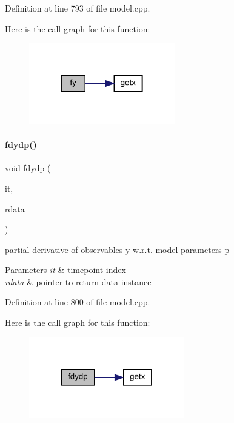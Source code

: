 Definition at line 793 of file model.\+cpp.

Here is the call graph for this function\+:
\nopagebreak
\begin{figure}[H]
\begin{center}
\leavevmode
\includegraphics[width=180pt]{classamici_1_1_model_acd37693bbc14eead48d9a40c72f42a89_cgraph}
\end{center}
\end{figure}
\mbox{\label{classamici_1_1_model_a884ccb083130cb1af7ebe93f7a6d361a}} 
\paragraph{\texorpdfstring{fdydp()}{fdydp()}\hspace{0.1cm}{\footnotesize\ttfamily [1/2]}}
{\footnotesize\ttfamily void fdydp (\begin{DoxyParamCaption}\item[{const int}]{it,  }\item[{\mbox{\hyperlink{classamici_1_1_return_data}{Return\+Data}} $\ast$}]{rdata }\end{DoxyParamCaption})}

partial derivative of observables y w.\+r.\+t. model parameters p 
\begin{DoxyParams}{Parameters}
{\em it} & timepoint index \\
\hline
{\em rdata} & pointer to return data instance \\
\hline
\end{DoxyParams}


Definition at line 800 of file model.\+cpp.

Here is the call graph for this function\+:
\nopagebreak
\begin{figure}[H]
\begin{center}
\leavevmode
\includegraphics[width=191pt]{classamici_1_1_model_a884ccb083130cb1af7ebe93f7a6d361a_cgraph}
\end{center}
\end{figure}
\mbox{\label{classamici_1_1_model_a3ec46e89aed7bd191fb21ac3e501edd2}} 
